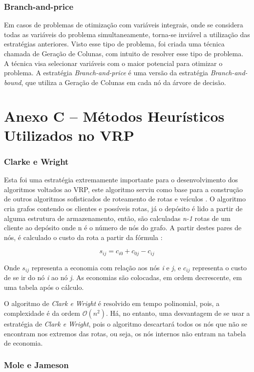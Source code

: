 \subsection*{Branch-and-price}
Em casos de problemas de otimização com variáveis integrais, onde se considera todas as variáveis do problema simultaneamente, torna-se inviável a utilização das estratégias anteriores. Visto esse tipo de problema, foi criada uma técnica chamada de Geração de Colunas, com intuito de resolver esse tipo de problema. A técnica visa selecionar variáveis com o maior potencial para otimizar o problema. A estratégia \emph{Branch-and-price} é uma versão da estratégia \emph{Branch-and-bound}, que utiliza a Geração de Colunas  em cada nó da árvore de decisão.

\chapter*{Anexo C -- Métodos Heurísticos Utilizados no VRP}
\label{anexo-metodos-heuristicos}
\subsection*{Clarke e Wright}
Esta foi uma estratégia extremamente importante para o desenvolvimento dos algoritmos voltados ao VRP, este algoritmo serviu como base para a construção de outros algoritmos sofisticados de roteamento de rotas e veículos \cite{milton-nascimento}. O algoritmo cria grafos contendo os clientes e possíveis rotas, já o depósito é lido a partir de alguma estrutura de armazenamento, então, são calculadas \emph{n-1} rotas de um cliente ao depósito onde n é o número de nós do grafo. A partir destes pares de nós, é calculado  o custo da rota a partir da fórmula \cite[p. 32]{maxwell}: 

\[ s_{ij} = c_{i0} + c_{0j} - c_{ij} \]

Onde $s_{ij}$ representa a economia com relação aos nós \emph{i} e \emph{j}, e $c_{ij}$ representa o custo de se ir do nó \emph{i} ao nó \emph{j}. As economias são colocadas, em ordem decrescente, em uma tabela após o cálculo. 

O algoritmo de \emph{Clark e Wright} é resolvido em tempo polinomial, pois, a complexidade é da ordem $\mathcal{O}(n^2)$. Há, no entanto, uma desvantagem de se usar a estratégia de \emph{Clark e Wright}, pois o algoritmo descartará todos os nós que não se encontram nos extremos das rotas, ou seja, os nós internos não entram na tabela de economia.
\subsection*{Mole e Jameson}

